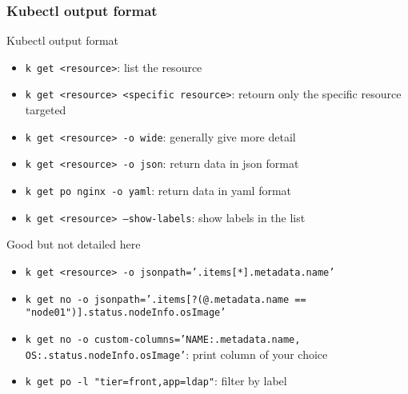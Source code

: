 \subsubsection{Kubectl output format}
\begin{frame}{Kubectl output format}
  \begin{itemize}
    \item \texttt{k get <resource>}: list the resource
    \item \texttt{k get <resource> <specific resource>}: retourn only the specific resource targeted
    \item \texttt{k get <resource> -o wide}: generally give more detail
    \item \texttt{k get <resource> -o json}: return data in json format
    \item \texttt{k get po nginx -o yaml}: return data in yaml format
    \item \texttt{k get <resource> --show-labels}: show labels in the list
  \end{itemize}
  Good but not detailed here
  \begin{itemize}
    \item \texttt{k get <resource> -o jsonpath='{.items[*].metadata.name}'}
    \item \texttt{k get no -o jsonpath='{.items[?(@.metadata.name == "node01")].status.nodeInfo.osImage}'}
    \item \texttt{k get no -o custom-columns='NAME:.metadata.name, OS:.status.nodeInfo.osImage'}: print column of your choice
    \item \texttt{k get po -l "tier=front,app=ldap"}: filter by label
  \end{itemize}
\end{frame}
